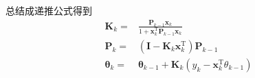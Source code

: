 总结成递推公式得到
\begin{align*}
\mathbf{K}_k =& \frac{\mathbf{P}_{k-1}\boldsymbol{x}_k}{1+\boldsymbol{x}_k^\mathrm{T}
\mathbf{P}_{k-1}\boldsymbol{x}_k} \\
\mathbf{P}_k =& (\mathbf{I}-\mathbf{K}_k\boldsymbol{x}_k^\mathrm{T})\mathbf{P}_{k-1}\\
\boldsymbol{\theta}_k =& \boldsymbol{\theta}_{k-1}
 +\mathbf{K}_k(y_k-\boldsymbol{x}_k^\mathrm{T}\theta_{k-1})
\end{align*}

